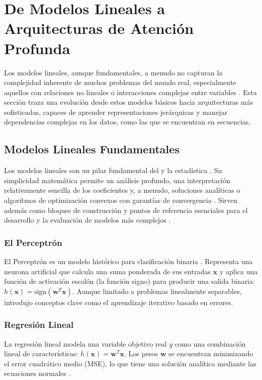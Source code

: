\section{De Modelos Lineales a Arquitecturas de Atención Profunda}
\label{sec:EvolucionModelos}

Los modelos lineales, aunque fundamentales, a menudo no capturan la complejidad inherente de muchos problemas del mundo real, especialmente aquellos con relaciones no lineales o interacciones complejas entre variables \citep{Bishop2006, Hastie2009}. Esta sección traza una evolución desde estos modelos básicos hacia arquitecturas más sofisticadas, capaces de aprender representaciones jerárquicas y manejar dependencias complejas en los datos, como las que se encuentran en secuencias.

\subsection{Modelos Lineales Fundamentales}
\label{subsec:ModelosLinealesFundamentalesRepaso}
Los modelos lineales son un pilar fundamental del  y la estadística \citep{Montgomery2021, Weisberg2005}. Su simplicidad matemática permite un análisis profundo, una interpretación relativamente sencilla de los coeficientes y, a menudo, soluciones analíticas o algoritmos de optimización convexos con garantías de convergencia \citep{Boyd2004}. Sirven además como bloques de construcción y puntos de referencia esenciales para el desarrollo y la evaluación de modelos más complejos \citep{Goodfellow2016}.

\subsubsection*{El Perceptrón}
\label{subsubsec:PerceptronRepaso}
El Perceptrón es un modelo histórico para clasificación binaria \citep{abu-mostafa_learning_2012}. Representa una neurona artificial que calcula una suma ponderada de sus entradas $\mathbf{x}$ y aplica una función de activación escalón (la función signo) para producir una salida binaria: $h(\mathbf{x}) = \text{sign}(\mathbf{w}^T \mathbf{x})$. Aunque limitado a problemas linealmente separables, introdujo conceptos clave como el aprendizaje iterativo basado en errores.

\subsubsection*{Regresión Lineal}
\label{subsubsec:RegresionLinealRepaso}
La regresión lineal modela una variable objetivo real $y$ como una combinación lineal de características: $h(\mathbf{x}) = \mathbf{w}^T \mathbf{x}$. Los pesos $\mathbf{w}$ se encuentran minimizando el error cuadrático medio (MSE), lo que tiene una solución analítica mediante las ecuaciones normales \citep{Bishop2006}.

